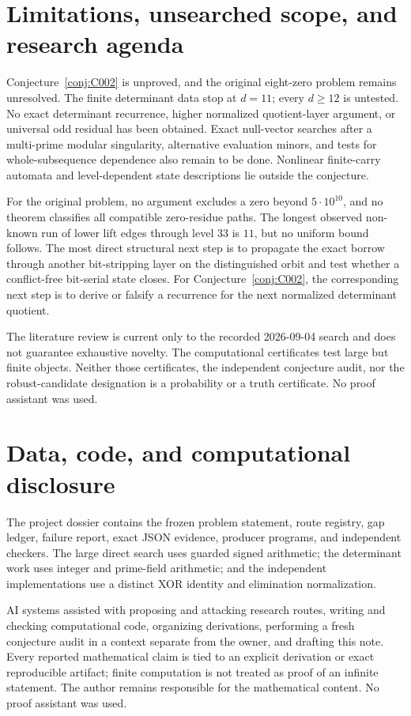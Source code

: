\documentclass[11pt]{amsart}
\theoremstyle{definition}
\begin{document}
\section{Limitations, unsearched scope, and research agenda}

Conjecture~\ref{conj:C002} is unproved, and the original eight-zero problem
remains unresolved.  The finite determinant data stop at $d=11$; every
$d\geq12$ is untested.  No exact determinant recurrence, higher normalized
quotient-layer argument, or universal odd residual has been obtained.  Exact
null-vector searches after a multi-prime modular singularity, alternative
evaluation minors, and tests for whole-subsequence dependence also remain to
be done.  Nonlinear finite-carry automata and level-dependent state
descriptions lie outside the conjecture.

For the original problem, no argument excludes a zero beyond
$5\cdot10^{10}$, and no theorem classifies all compatible zero-residue paths.
The longest observed non-known run of lower lift edges through level $33$ is
$11$, but no uniform bound follows.  The most direct structural next step is
to propagate the exact borrow through another bit-stripping layer on the
distinguished orbit and test whether a conflict-free bit-serial state closes.
For Conjecture~\ref{conj:C002}, the corresponding next step is to derive or
falsify a recurrence for the next normalized determinant quotient.

The literature review is current only to the recorded 2026-09-04 search and
does not guarantee exhaustive novelty.  The computational certificates test
large but finite objects.  Neither those certificates, the independent
conjecture audit, nor the robust-candidate designation is a probability or a
truth certificate.  No proof assistant was used.

\section*{Data, code, and computational disclosure}

The project dossier contains the frozen problem statement, route registry,
gap ledger, failure report, exact JSON evidence, producer programs, and
independent checkers.  The large direct search uses guarded signed arithmetic;
the determinant work uses integer and prime-field arithmetic; and the
independent implementations use a distinct XOR identity and elimination
normalization.

AI systems assisted with proposing and attacking research routes, writing and
checking computational code, organizing derivations, performing a fresh
conjecture audit in a context separate from the owner, and drafting this note.
Every reported mathematical claim is tied to an explicit derivation or exact
reproducible artifact; finite computation is not treated as proof of an
infinite statement.  The author remains responsible for the mathematical
content.  No proof assistant was used.



\end{document}
